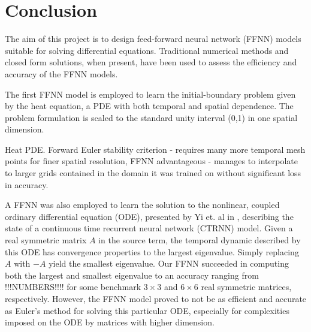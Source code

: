 \section{Conclusion}\label{sec:Conclusion}

The aim of this project is to design feed-forward neural network (FFNN) models suitable for solving differential equations. Traditional numerical methods and closed form solutions, when present, have been used to assess the efficiency and accuracy of the FFNN models.

The first FFNN model is employed to learn the initial-boundary problem given by the heat equation, a PDE with both temporal and spatial dependence. The problem formulation is scaled to the standard unity interval (0,1) in one spatial dimension. 

Heat PDE. Forward Euler stability criterion - requires many more temporal mesh points for finer spatial resolution, FFNN advantageous - manages to interpolate to larger grids contained in the domain it was trained on without significant loss in accuracy.

A FFNN was also employed to learn the solution to the nonlinear, coupled ordinary differential equation (ODE), presented by Yi et. al in \cite{yfh04}, describing the state of a continuous time recurrent neural network (CTRNN) model. Given a real symmetric matrix $A$ in the source term, the temporal dynamic described by this ODE has convergence properties to the largest eigenvalue. Simply replacing $A$ with $-A$ yield the smallest eigenvalue. Our FFNN succeeded in computing both the largest and smallest eigenvalue to an accuracy ranging from !!!NUMBERS!!!! for some benchmark $3\times 3$ and $6\times 6$ real symmetric matrices, respectively. However, the FFNN model proved to not be as efficient and accurate as Euler's method for solving this particular ODE, especially for complexities imposed on the ODE by matrices with higher dimension.